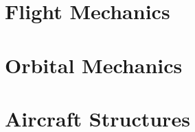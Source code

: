 \documentclass{book}
\begin{document}


\chapter{Flight Mechanics}



\chapter{Orbital Mechanics}



\chapter{Aircraft Structures}



\clearpage



\end{document}
